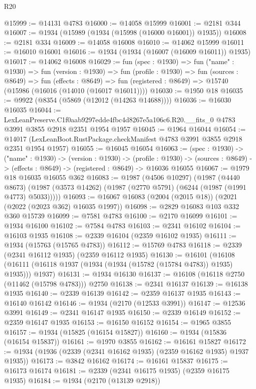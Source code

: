 \begin{lexlean}{R20}
\begin{coremodule}
@15999 := @14131 @4783
@16000 := @14058 @15999
@16001 := @2181 @344
@16007 := @1934 (@15989 (@1934 (@15998 (@16000 @16001)) @1935))
@16008 := @2181 @334
@16009 := @14058 @16008
@16010 := @14062 @15999
@16011 := @16010 @16001
@16016 := @1934 (@1934 (@16007 (@16009 @16011)) @1935)
@16017 := @14062 @16008
@16029 := fun (spec : @1930) =>
  fun ("name" : @1930) =>
  fun (version : @1930) =>
  fun (profile : @1930) =>
  fun (sources : @8649) =>
  fun (effects : @8649) =>
  fun (registered : @8649) => @15740 (@15986 (@16016 (@14010 (@16017 @16011))))
@16030 := @1950 @18
@16035 := @9922 (@8354 (@5869 (@12012 (@14263 @14688))))
@16036 := @16030 @16035
@16044 := LexLeanPreserve.C1f0aab9297edde4fbc4d8267e5a106c6.R20.__fits_0
    @4783
    @3991
    @3855
    @2918
    @2351
    @1954
    @1957
@16045 := @1964 @16044
@16054 := @14017 (LexLeanBoot.RustPackage.checkManifest @4783 @3991 @3855 @2918 @2351 @1954 @1957)
@16055 := @16045 @16054
@16063 := (spec : @1930) ->
  ("name" : @1930) ->
  (version : @1930) ->
  (profile : @1930) ->
  (sources : @8649) -> (effects : @8649) -> (registered : @8649) -> @16036 @16055
@16067 := @1979 @18 @16035 @16055 @362
@16083 := @1987
    (@4506 @10297)
    (@1987
      (@4440 @8673)
      (@1987 (@3573 @14262) (@1987 (@2770 @5791) (@6244 (@1987 (@1991 @4773) @5033)))))
@16093 := @16067 @16083 (@2004 (@2015 @18)) (@2021 (@2022 (@2023 @362) @16035 @1997))
@16098 := @2829 @16083 @103 @332 @360 @15739
@16099 := @7581 @4783
@16100 := @2170 @16099
@16101 := @1934 @16100
@16102 := @7584 @4783
@16103 := @2341 @16102
@16104 := @16103 @1935
@16108 := @2339 @16104 (@2359 @16102 @1935)
@16111 := @1934 (@15763 (@15765 @4783))
@16112 := @15769 @4783
@16118 := @2339 (@2341 @16112 @1935) (@2359 @16112 @1935)
@16130 := @16101
    (@16108 (@16111 (@16118 @1937 (@1934 (@1934 (@15782 (@15784 @4783)) @1935) @1935))) @1937)
@16131 := @1934 @16130
@16137 := @16108 (@16118 @2750 (@11462 (@15798 @4783))) @2750
@16138 := @2341 @16137
@16139 := @16138 @1935
@16140 := @2339 @16139
@16142 := @2359 @16137 @1935
@16143 := @16140 @16142
@16146 := @1934 (@2170 (@12533 @3991))
@16147 := @12536 @3991
@16149 := @2341 @16147 @1935
@16150 := @2339 @16149
@16152 := @2359 @16147 @1935
@16153 := @16150 @16152
@16154 := @1965 @3855
@16157 := @1934 (@15825 (@16154 @15827))
@16160 := @1934 (@15836 (@16154 @15837))
@16161 := @1970 @3855
@16162 := @16161 @15827
@16172 := @1934 (@1936 (@2339 (@2341 @16162 @1935) (@2359 @16162 @1935) @1937 @1935))
@16173 := @3842 @16162
@16174 := @16161 @15837
@16175 := @16173 @16174
@16181 := @2339 (@2341 @16175 @1935) (@2359 @16175 @1935)
@16184 := @1934 (@2170 (@13139 @2918))

\end{coremodule}
\end{lexlean}
